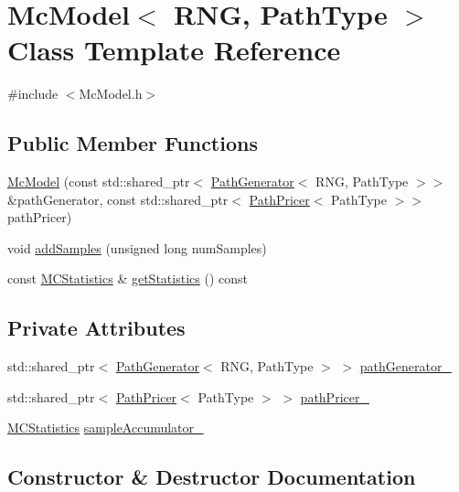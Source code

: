 \hypertarget{class_mc_model}{}\section{Mc\+Model$<$ R\+NG, Path\+Type $>$ Class Template Reference}
\label{class_mc_model}


{\ttfamily \#include $<$Mc\+Model.\+h$>$}

\subsection*{Public Member Functions}
\begin{DoxyCompactItemize}
\item 
\hyperlink{class_mc_model_a2c4ccfd7b882e80516e1f9733243e48d}{Mc\+Model} (const std\+::shared\+\_\+ptr$<$ \hyperlink{class_path_generator}{Path\+Generator}$<$ R\+NG, Path\+Type $>$$>$ \&path\+Generator, const std\+::shared\+\_\+ptr$<$ \hyperlink{class_path_pricer}{Path\+Pricer}$<$ Path\+Type $>$$>$ path\+Pricer)
\item 
void \hyperlink{class_mc_model_a6ce369cb607a221259e4a93bb63ea4ec}{add\+Samples} (unsigned long num\+Samples)
\item 
const \hyperlink{class_m_c_statistics}{M\+C\+Statistics} \& \hyperlink{class_mc_model_a07af7562a83c0bc16ba822ac52154684}{get\+Statistics} () const
\end{DoxyCompactItemize}
\subsection*{Private Attributes}
\begin{DoxyCompactItemize}
\item 
std\+::shared\+\_\+ptr$<$ \hyperlink{class_path_generator}{Path\+Generator}$<$ R\+NG, Path\+Type $>$ $>$ \hyperlink{class_mc_model_abb4ba15045ba3c05d2f54340a63a1000}{path\+Generator\+\_\+}
\item 
std\+::shared\+\_\+ptr$<$ \hyperlink{class_path_pricer}{Path\+Pricer}$<$ Path\+Type $>$ $>$ \hyperlink{class_mc_model_aa05affe30ae38a403977d3b708d46608}{path\+Pricer\+\_\+}
\item 
\hyperlink{class_m_c_statistics}{M\+C\+Statistics} \hyperlink{class_mc_model_a3ec600743d8341a4cd46b5005a0f70ff}{sample\+Accumulator\+\_\+}
\end{DoxyCompactItemize}


\subsection{Constructor \& Destructor Documentation}
\hypertarget{class_mc_model_a2c4ccfd7b882e80516e1f9733243e48d}{}\label{class_mc_model_a2c4ccfd7b882e80516e1f9733243e48d} 
